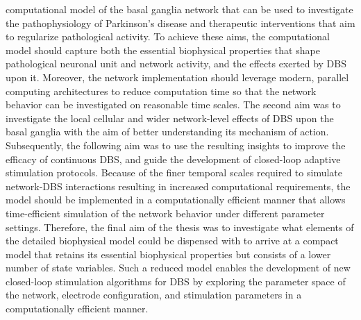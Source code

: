 computational model of the basal ganglia network that can be used to investigate the
pathophysiology of Parkinson’s disease and therapeutic interventions that aim to 
regularize pathological activity.
To achieve these aims, the computational model should capture both the essential 
biophysical properties that shape pathological neuronal unit and network activity,
and the effects exerted by DBS upon it.
Moreover, the network implementation should leverage modern, parallel computing
architectures to reduce computation time so that the network behavior can be investigated
on reasonable time scales.
%
%
%
%
The second aim  was to investigate the local cellular and wider 
network-level effects of DBS upon the basal ganglia with the aim of better understanding
its mechanism of action. Subsequently, the following aim was to use the resulting insights 
to improve the efficacy of continuous DBS, and guide the development of closed-loop 
adaptive stimulation protocols. Because of the finer temporal scales required
to simulate network-DBS interactions resulting in increased computational requirements,
the model should be implemented in a computationally efficient manner that allows
time-efficient simulation of the network behavior under different parameter settings.
Therefore, the final aim of the thesis was to investigate what elements of the detailed 
biophysical model could be dispensed with to arrive at a compact model that retains
its essential biophysical properties but consists of a lower number of state variables.
%
%
Such a reduced model enables the development of new closed-loop stimulation
algorithms for DBS by exploring the parameter space of the network,
electrode configuration, and stimulation parameters in a computationally efficient
manner.

%


